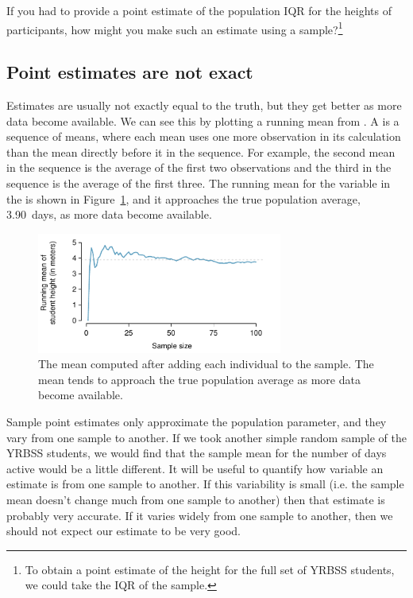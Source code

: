 \begin{exercise}
If you had to provide a point estimate of the population IQR for the heights of participants, how might you make such an estimate using a sample?\footnote{To obtain a point estimate of the height for the full set of YRBSS students, we could take the IQR of the sample.}


\end{exercise}

\subsection{Point estimates are not exact}

Estimates are usually not exactly equal to the truth, but they get better as more data become available. We can see this by plotting a running mean from . A  is a sequence of means, where each mean uses one more observation in its calculation than the mean directly before it in the sequence. For example, the second mean in the sequence is the average of the first two observations and the third in the sequence is the average of the first three. The running mean for the  variable in the  is shown in Figure~\ref{yrbssActiveRunningMean}, and it approaches the true population average, 3.90~days, as more data become available.

\begin{figure}[h]
   \centering
   \includegraphics[width=0.72\textwidth]{ch_inference_foundations/figures/yrbssActiveRunningMean/yrbssActiveRunningMean}
   \caption{The mean computed after adding each individual to the sample. The mean tends to approach the true population average as more data become available.}
   \label{yrbssActiveRunningMean}
\end{figure}

Sample point estimates only approximate the population parameter, and they vary from one sample to another. If we took another simple random sample of the YRBSS students, we would find that the sample mean for the number of days active would be a little different. It will be useful to quantify how variable an estimate is from one sample to another. If this variability is small (i.e. the sample mean doesn't change much from one sample to another) then that estimate is probably very accurate. If it varies widely from one sample to another, then we should not expect our estimate to be very good.



